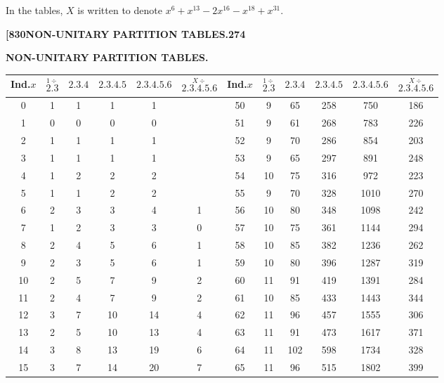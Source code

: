 \documentclass[12pt,a4paper]{article}
\theoremstyle{definition}
\begin{document}
In the tables, $X$ is written to denote $x^6 + x^{13} - 2x^{16} - x^{18} + x^{31}$.

\newpage
\setcounter{page}{274}

\noindent\textbf{[830}\hfill\textbf{NON-UNITARY PARTITION TABLES.}\hfill\textbf{274}

\bigskip

\begin{center}
\textbf{NON-UNITARY PARTITION TABLES.}
\end{center}

\begin{center}
\small
\begin{tabular}{|c|c|c|c|c|c||c|c|c|c|c|c|}
\hline
Ind.$x$ & $\stackrel{1\div}{\mathbf{2.3}}$ & $\mathbf{2.3.4}$ & $\mathbf{2.3.4.5}$ & $\mathbf{2.3.4.5.6}$ & $\stackrel{X\div}{\mathbf{2.3.4.5.6}}$ & Ind.$x$ & $\stackrel{1\div}{\mathbf{2.3}}$ & $\mathbf{2.3.4}$ & $\mathbf{2.3.4.5}$ & $\mathbf{2.3.4.5.6}$ & $\stackrel{X\div}{\mathbf{2.3.4.5.6}}$ \\
\hline
0 & 1 & 1 & 1 & 1 & & 50 & 9 & 65 & 258 & 750 & 186 \\
1 & 0 & 0 & 0 & 0 & & 51 & 9 & 61 & 268 & 783 & 226 \\
2 & 1 & 1 & 1 & 1 & & 52 & 9 & 70 & 286 & 854 & 203 \\
3 & 1 & 1 & 1 & 1 & & 53 & 9 & 65 & 297 & 891 & 248 \\
4 & 1 & 2 & 2 & 2 & & 54 & 10 & 75 & 316 & 972 & 223 \\
5 & 1 & 1 & 2 & 2 & & 55 & 9 & 70 & 328 & 1010 & 270 \\
6 & 2 & 3 & 3 & 4 & 1 & 56 & 10 & 80 & 348 & 1098 & 242 \\
7 & 1 & 2 & 3 & 3 & 0 & 57 & 10 & 75 & 361 & 1144 & 294 \\
8 & 2 & 4 & 5 & 6 & 1 & 58 & 10 & 85 & 382 & 1236 & 262 \\
9 & 2 & 3 & 5 & 6 & 1 & 59 & 10 & 80 & 396 & 1287 & 319 \\
10 & 2 & 5 & 7 & 9 & 2 & 60 & 11 & 91 & 419 & 1391 & 284 \\
11 & 2 & 4 & 7 & 9 & 2 & 61 & 10 & 85 & 433 & 1443 & 344 \\
12 & 3 & 7 & 10 & 14 & 4 & 62 & 11 & 96 & 457 & 1555 & 306 \\
13 & 2 & 5 & 10 & 13 & 4 & 63 & 11 & 91 & 473 & 1617 & 371 \\
14 & 3 & 8 & 13 & 19 & 6 & 64 & 11 & 102 & 598 & 1734 & 328 \\
15 & 3 & 7 & 14 & 20 & 7 & 65 & 11 & 96 & 515 & 1802 & 399 \\

\end{tabular}
\end{center}
\end{document}
